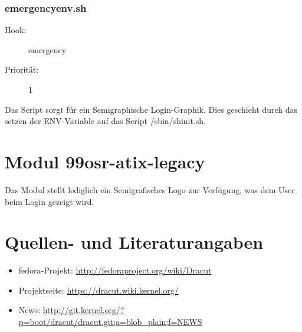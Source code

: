 \documentclass[10pt,a4paper]{article}
\begin{document}
\subsubsection{emergencyenv.sh}
\begin{description}
\item[Hook:] emergency
\item[Priorität:] 1
\end{description}

Das Script sorgt für ein Semigraphische Login-Graphik. Dies geschieht durch das setzen der ENV-Variable auf das Script /sbin/shinit.sh.

\section{Modul 99osr-atix-legacy}

Das Modul stellt lediglich ein Semigrafisches Logo zur Verfügung, was dem User beim Login gezeigt wird.

\section{Quellen- und Literaturangaben}
\label{sec:quell}

\begin{itemize}
 \item fedora-Projekt: \url{http://fedoraproject.org/wiki/Dracut}
 \item Projektseite: \url{https://dracut.wiki.kernel.org/}
 \item News: \url{http://git.kernel.org/?p=boot/dracut/dracut.git;a=blob_plain;f=NEWS}
\end{itemize}
\end{document}
